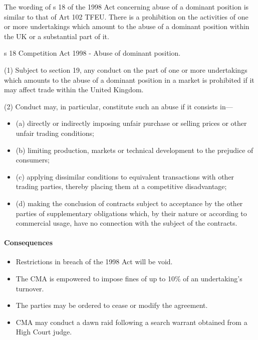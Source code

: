 \documentclass[
]{article}
\providecommand{\tightlist}{%
  \setlength{\itemsep}{0pt}\setlength{\parskip}{0pt}}
\newenvironment{env-69c6d983-4e25-44a5-9a13-662902d85e33}
{
    \savenotes\tcolorbox[blanker,breakable,left=5pt,borderline west={2pt}{-4pt}{green}]
}
{
    \endtcolorbox\spewnotes
}
\begin{document}
The wording of s 18 of the 1998 Act concerning abuse of a dominant
position is similar to that of Art 102 TFEU. There is a prohibition on
the activities of one or more undertakings which amount to the abuse of
a dominant position within the UK or a substantial part of it.

\begin{env-69c6d983-4e25-44a5-9a13-662902d85e33}

s 18 Competition Act 1998 - Abuse of dominant position.

(1) Subject to section 19, any conduct on the part of one or more
undertakings which amounts to the abuse of a dominant position in a
market is prohibited if it may affect trade within the United Kingdom.

(2) Conduct may, in particular, constitute such an abuse if it consists
in---

\begin{itemize}
\tightlist
\item
  (a) directly or indirectly imposing unfair purchase or selling prices
  or other unfair trading conditions;
\item
  (b) limiting production, markets or technical development to the
  prejudice of consumers;
\item
  (c) applying dissimilar conditions to equivalent transactions with
  other trading parties, thereby placing them at a competitive
  disadvantage;
\item
  (d) making the conclusion of contracts subject to acceptance by the
  other parties of supplementary obligations which, by their nature or
  according to commercial usage, have no connection with the subject of
  the contracts.
\end{itemize}

\end{env-69c6d983-4e25-44a5-9a13-662902d85e33}

\hypertarget{consequences}{%
\paragraph{Consequences}\label{consequences}}

\begin{itemize}
\tightlist
\item
  Restrictions in breach of the 1998 Act will be void.
\item
  The CMA is empowered to impose fines of up to 10\% of an undertaking's
  turnover.
\item
  The parties may be ordered to cease or modify the agreement.
\item
  CMA may conduct a dawn raid following a search warrant obtained from a
  High Court judge.
\end{itemize}
\end{document}
